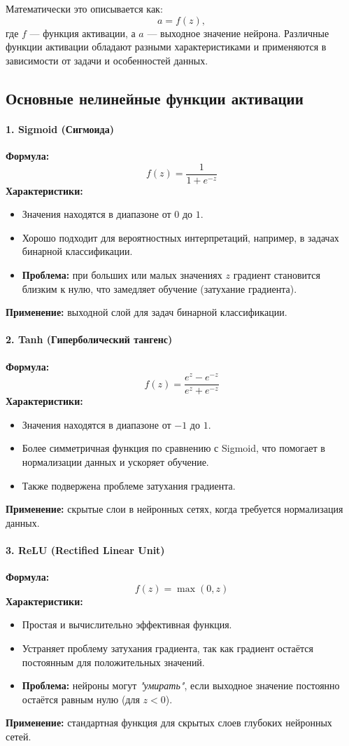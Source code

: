 {Математически это описывается как:
\[
    a = f(z),
\]
где $f$ — функция активации, а $a$ — выходное значение нейрона. Различные функции активации обладают разными характеристиками и применяются в зависимости от задачи и особенностей данных.

\subsection*{Основные нелинейные функции активации}

\paragraph{1. Sigmoid (Сигмоида)}
\textbf{Формула:}
\[
    f(z) = \frac{1}{1 + e^{-z}}
\]
\textbf{Характеристики:}
\begin{itemize}
    \item Значения находятся в диапазоне от $0$ до $1$.
    \item Хорошо подходит для вероятностных интерпретаций, например, в задачах бинарной классификации.
    \item \textbf{Проблема:} при больших или малых значениях $z$ градиент становится близким к нулю, что замедляет обучение (затухание градиента).
\end{itemize}
\textbf{Применение:} выходной слой для задач бинарной классификации.

\paragraph{2. Tanh (Гиперболический тангенс)}
\textbf{Формула:}
\[
    f(z) = \frac{e^z - e^{-z}}{e^z + e^{-z}}
\]
\textbf{Характеристики:}
\begin{itemize}
    \item Значения находятся в диапазоне от $-1$ до $1$.
    \item Более симметричная функция по сравнению с Sigmoid, что помогает в нормализации данных и ускоряет обучение.
    \item Также подвержена проблеме затухания градиента.
\end{itemize}
\textbf{Применение:} скрытые слои в нейронных сетях, когда требуется нормализация данных.

\paragraph{3. ReLU (Rectified Linear Unit)}
\textbf{Формула:}
\[
    f(z) = \max(0, z)
\]
\textbf{Характеристики:}
\begin{itemize}
    \item Простая и вычислительно эффективная функция.
    \item Устраняет проблему затухания градиента, так как градиент остаётся постоянным для положительных значений.
    \item \textbf{Проблема:} нейроны могут \textit{"умирать"}, если выходное значение постоянно остаётся равным нулю (для $z < 0$).
\end{itemize}
\textbf{Применение:} стандартная функция для скрытых слоев глубоких нейронных сетей.

}
